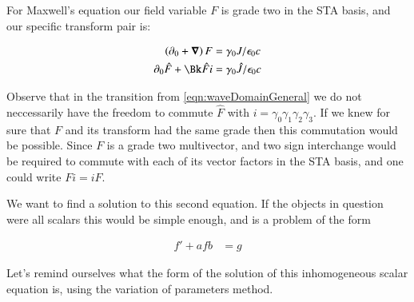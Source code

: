 \documentclass{article}
\begin{document}
For Maxwell's equation our field variable $F$ is grade two in the STA basis, and our specific transform pair is:

\begin{align}
\left(\partial_0 + \spacegrad \right) F &= \gamma_0 J/\epsilon_0 c \\
\partial_0 \hat{F} + \Bk \hat{F} i &= \gamma_0 \hat{J}/ \epsilon_0 c
\end{align}

Observe that in the transition from
\ref{eqn:waveDomainGeneral} we do not neccessarily have the freedom to commute $\hat{F}$ with $i = \gamma_0 \gamma_1 \gamma_2 \gamma_3$.
If we knew for sure that $F$ and its transform had the same grade then this commutation would be possible.  Since $F$ is a grade
two multivector, and two sign interchange would be required to commute with each of its vector factors in the STA basis, and one could write $F i = i F$.

We want to find a solution to this second equation.  If the objects in question were all scalars this would be simple enough, and is
a problem of the form

\begin{align*}
f' + a f b &= g
\end{align*}

Let's remind ourselves what the form of the solution of this inhomogeneous scalar equation is, using the variation of parameters method.



\end{document}

